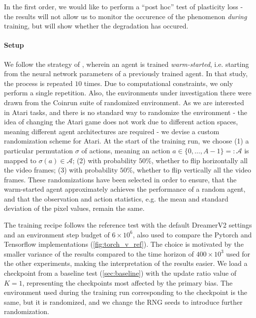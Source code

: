 \documentclass[en]{pracamgr}
\begin{document}
In the first order, we would like to perform a ``post hoc'' test of plasticity loss - the results will not allow us to monitor the occurence of the phenomenon \emph{during} training, but will show whether the degradation has occured.

\paragraph{Setup} We follow the strategy of \autocite{julianiStudyPlasticityLoss2024}, wherein an agent is trained \emph{warm-started}, i.e. starting from the neural network parameters of a previously trained agent. In that study, the process is repeated $10$ times. Due to computational constraints, we only perform a single repetition. Also, the environments under investigation there were drawn from the Coinrun suite of randomized environment. As we are interested in Atari tasks, and there is no standard way to randomize the environment - the idea of changing the Atari game does not work due to different action spaces, meaning different agent architectures are required - we devise a custom randomization scheme for Atari. At the start of the training run, we choose (1) a particular permutation $\sigma$ of actions, meaning an action $a \in \{0, \ldots, A - 1\} =: \mathcal{A}$ is mapped to $\sigma(a) \in \mathcal{A}$; (2) with probability $50\%$, whether to flip horizontally all the video frames; (3) with probability $50\%$, whether to flip vertically all the video frames. These randomizations have been selected in order to ensure, that the warm-started agent approximately achieves the performance of a random agent, and that the observation and action statistics, e.g. the mean and standard deviation of the pixel values, remain the same.

The training recipe follows the reference test with the default DreamerV2 settings and an environment step budget of $6 \times 10^6$, also used to compare the Pytorch and Tensorflow implementations (\autoref{fig:torch_v_ref}). The choice is motivated by the smaller variance of the results compared to the time horizon of $400 \times 10^3$ used for the other experiments, making the interpretation of the results easier. We load a checkpoint from a baseline test (\autoref{sec:baseline}) with the update ratio value of $K = 1$, representing the checkpoints most affected by the primary bias. The environment used during the training run corresponding to the checkpoint is the same, but it is randomized, and we change the RNG seeds to introduce further randomization.
\end{document}
